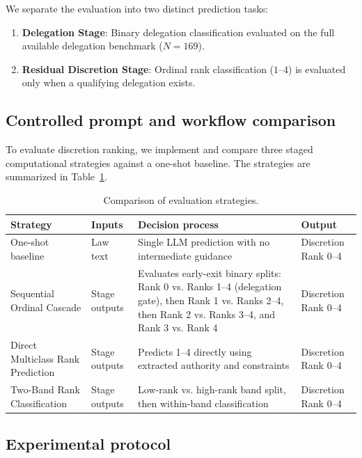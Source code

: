 \documentclass[conference]{IEEEtran}
\begin{document}
We separate the evaluation into two distinct prediction tasks:
\begin{enumerate}
    \item \textbf{Delegation Stage}: Binary delegation classification evaluated on the full available delegation benchmark ($N=169$).
    \item \textbf{Residual Discretion Stage}: Ordinal rank classification ($1$--$4$) is evaluated only when a qualifying delegation exists.
\end{enumerate}


\subsection{Controlled prompt and workflow comparison}

To evaluate discretion ranking, we implement and compare three staged computational strategies against a one-shot baseline. The strategies are summarized in Table~\ref{tab:strategies_comparison}.

\begin{table}[t]
\centering
\caption{Comparison of evaluation strategies.}
\label{tab:strategies_comparison}
\small
\begin{tabularx}{\textwidth}{@{}l X X X@{}}
\toprule
\textbf{Strategy} & \textbf{Inputs} & \textbf{Decision process} & \textbf{Output} \\
\midrule
One-shot baseline & Law text & Single LLM prediction with no intermediate guidance & Discretion Rank 0--4 \\
\addlinespace
Sequential Ordinal Cascade & Stage outputs & Evaluates early-exit binary splits: Rank 0 vs. Ranks 1--4 (delegation gate), then Rank 1 vs. Ranks 2--4, then Rank 2 vs. Ranks 3--4, and Rank 3 vs. Rank 4 & Discretion Rank 0--4 \\
\addlinespace
Direct Multiclass Rank Prediction & Stage outputs & Predicts 1--4 directly using extracted authority and constraints & Discretion Rank 0--4 \\
\addlinespace
Two-Band Rank Classification & Stage outputs & Low-rank vs. high-rank band split, then within-band classification & Discretion Rank 0--4 \\
\bottomrule
\end{tabularx}
\end{table}

\subsection{Experimental protocol}
\end{document}
